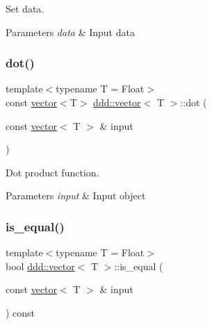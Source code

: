 Set data. 


\begin{DoxyParams}{Parameters}
{\em data} & Input data \\
\hline
\end{DoxyParams}
\mbox{\label{classddd_1_1vector_a61e3ccdb85f4d41c142c80b429808baf}} 
\subsubsection{\texorpdfstring{dot()}{dot()}}
{\footnotesize\ttfamily template$<$typename T = Float$>$ \\
const \hyperlink{classddd_1_1vector}{vector}$<$T$>$ \hyperlink{classddd_1_1vector}{ddd\+::vector}$<$ T $>$\+::dot (\begin{DoxyParamCaption}\item[{const \hyperlink{classddd_1_1vector}{vector}$<$ T $>$ \&}]{input }\end{DoxyParamCaption})\hspace{0.3cm}{\ttfamily [inline]}}



Dot product function. 


\begin{DoxyParams}{Parameters}
{\em input} & Input object \\
\hline
\end{DoxyParams}
\mbox{\label{classddd_1_1vector_a860847a7c7c93e52b4a83af722eb60f7}} 
\subsubsection{\texorpdfstring{is\+\_\+equal()}{is\_equal()}}
{\footnotesize\ttfamily template$<$typename T = Float$>$ \\
bool \hyperlink{classddd_1_1vector}{ddd\+::vector}$<$ T $>$\+::is\+\_\+equal (\begin{DoxyParamCaption}\item[{const \hyperlink{classddd_1_1vector}{vector}$<$ T $>$ \&}]{input }\end{DoxyParamCaption}) const\hspace{0.3cm}{\ttfamily [inline]}}



